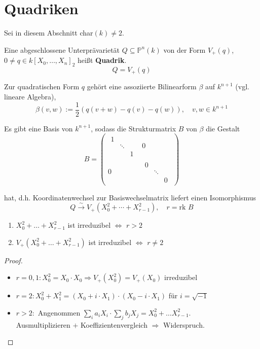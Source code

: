 \section{Quadriken}
\label{sec:quadriken}

Sei in diesem Abschnitt char$(k)\neq2$.
\begin{defn}[orig. 57]
  \label{def:quadrik}
  Eine abgeschlossene Unterprävarietät $Q\subseteq\mathbb{P}^{n}(k)$
  von der Form $V_{+}(q)$, $0 \neq q\in k[X_{0},\ldots,X_{n}]_{2}$
  heißt \textbf{Quadrik}.
  \[
    Q=V_{+}(q)
  \]

  Zur quadratischen Form $q$ gehört eine assoziierte Bilinearform $\beta$ auf
  $k^{n+1}$ (vgl. lineare Algebra), 
  \[
    \beta(v,w):=\frac{1}{2}(q(v+w)-q(v)-q(w)),\quad v,w\in k^{n+1}
  \]

Es gibt eine Basis von $k^{n+1}$, sodass die Strukturmatrix $B$
von $\beta$ die Gestalt
\[
  B=\begin{pmatrix}
    \begin{array}{ccc}
      1\\
      & \ddots\\
      &  & 1
    \end{array} & 0\\
    0 &
    \begin{array}{ccc}
      0\\
      & \ddots\\
      &  & 0
    \end{array}
  \end{pmatrix}
\]

hat, d.h. Koordinatenwechsel zur Basiswechselmatrix liefert einen
Isomorphismus
\[
  Q\xrightarrow{\sim}V_{+}(X_{0}^{2}+\cdots+X_{r-1}^{2}),\quad r=\text{rk }B
\]
\end{defn}
\begin{lem}[orig. 58]
\label{lem:irreduzibilitaet-quadriken}
	\begin{enumerate}
	
		\item $X_{0}^{2} + \ldots + X_{r-1}^{2}$ ist irreduzibel $\iff$ $r > 2$
		\item $V_{+}(X_{0}^{2} + \ldots + X_{r-1}^{2})$ ist irreduzibel $\iff$ $r \neq 2$
	\end{enumerate}
\end{lem}
\begin{proof}
	\begin{itemize}
		\item $r=0,1: X_{0}^2 = X_{0} \cdot X_{0} \Rightarrow V_{+}(X_{0}^2) = V_{+}(X_{0})$ irreduzibel
		\item $r=2: X_{0}^{2} + X_{1}^{2} = (X_{0} + i\cdot X_{1})\cdot(X_{0} - i \cdot X_{1})$ für $i = \sqrt{-1}$ 
		\item $r>2: $ Angenommen $\sum_{i}{a_{i} X_{i}} \cdot \sum_{j}{b_{j}X_{j}} = X_{0}^{2} + \ldots X_{r-1}^{2}$.\\
		Ausmultiplizieren $+$ Koeffizientenvergleich $\Rightarrow$ Widerspruch.
	\end{itemize}
\end{proof}

